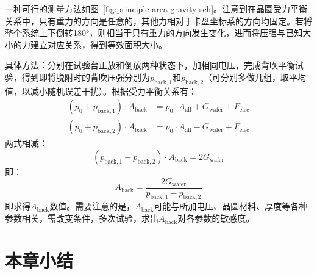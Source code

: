 一种可行的测量方法如图~\ref{fig:principle-area-gravity-sch}。注意到在晶圆受力平衡关系中，只有重力的方向是任意的，其他力相对于卡盘坐标系的方向均固定。若将整个系统上下倒转\ang{180}，则相当于只有重力的方向发生变化，进而将压强与已知大小的力建立对应关系，得到等效面积大小。

具体方法：分别在试验台正放和倒放两种状态下，加相同电压，完成背吹平衡试验，得到即将脱附时的背吹压强分别为$p_{\mathrm{back},1}$和$p_{\mathrm{back},2}$（可分别多做几组，取平均值，以减小随机误差干扰）。根据受力平衡关系有：
\begin{equation}
\label{eq:principle-area-gravity-orig}
\begin{aligned}
(p_{0} + p_{\mathrm{back},1}) \cdot A_{\mathrm{back}} & = p_0 \cdot A_{\mathrm{all}} + G_{\mathrm{wafer}} + F_{\mathrm{elec}} \\
(p_{0} + p_{\mathrm{back},2}) \cdot A_{\mathrm{back}} & = p_0 \cdot A_{\mathrm{all}} - G_{\mathrm{wafer}} + F_{\mathrm{elec}}
\end{aligned}
\end{equation}
两式相减：
\[
(p_{\mathrm{back},1} - p_{\mathrm{back},2}) \cdot A_{\mathrm{back}} = 2 G_{\mathrm{wafer}}
\]
即：
\begin{equation}
\label{eq:principle-area-gravity-derived}
A_{\mathrm{back}} = \frac{2 G_{\mathrm{wafer}}}{p_{\mathrm{back},1} - p_{\mathrm{back},2}}
\end{equation}
即求得$A_{\mathrm{back}}$数值。需要注意的是，$A_{\mathrm{back}}$可能与所加电压、晶圆材料、厚度等各种参数相关，需改变条件，多次试验，求出$A_{\mathrm{back}}$对各参数的敏感度。




\section{本章小结}\label{sec:principle-summary}
